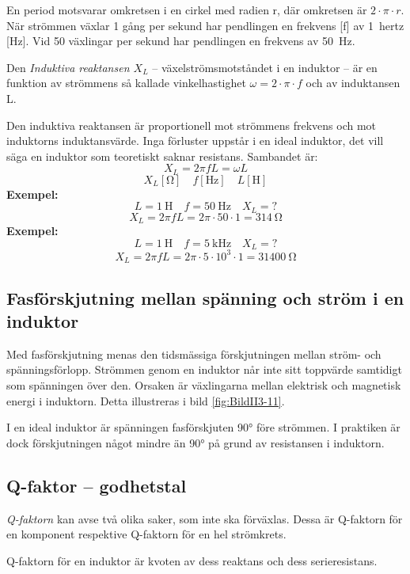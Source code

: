 En period motsvarar omkretsen i en cirkel med radien r, där omkretsen är
\(2 \cdot \pi  \cdot r\). När strömmen växlar 1 gång per sekund har
pendlingen en frekvens [f] av 1~hertz [Hz].
Vid 50 växlingar per sekund har pendlingen en frekvens av \SI{50}{\hertz}.

Den \emph{Induktiva reaktansen \(X_L\)} -- växelströmsmotståndet i en induktor -- 
är en funktion av strömmens så kallade vinkelhastighet \(\omega = 2 \cdot \pi  \cdot f\)
och av induktansen L.

Den induktiva reaktansen är proportionell mot strömmens frekvens och mot
induktorns induktansvärde. Inga förluster uppstår i en ideal induktor, det vill säga 
en induktor som teoretiskt saknar resistans.
Sambandet är:
\[X_L = 2\pi fL = \omega L\]
\[X_L [\si{\ohm}] \quad f [\si{\hertz}] \quad L [\si{\henry}]\]
\textbf{Exempel:}
\[L = \SI{1}{\henry} \quad f = \SI{50}{\hertz} \quad X_L = ?\]
\[X_L = 2\pi fL = 2\pi \cdot 50 \cdot 1 = \SI{314}{\ohm}\]
\textbf{Exempel:}
\[L = \SI{1}{\henry} \quad f = \SI{5}{\kilo\hertz} \quad X_L = ?\]
\[X_L = 2\pi fL = 2\pi  \cdot 5 \cdot 10^3 \cdot 1 = \SI{31400}{\ohm}\]

\subsection{Fasförskjutning mellan spänning och ström i en induktor}

Med fasförskjutning menas den tidsmässiga förskjutningen mellan ström- och
spänningsförlopp. Strömmen genom en induktor når inte sitt toppvärde samtidigt
som spänningen över den. Orsaken är växlingarna mellan elektrisk och magnetisk
energi i induktorn.
Detta illustreras i bild \ref{fig:BildII3-11}.

I en ideal induktor är spänningen fasförskjuten \ang{90} före strömmen.
I praktiken är dock förskjutningen något mindre än \ang{90} på grund av
resistansen i induktorn.

\subsection{Q-faktor -- godhetstal}

\emph{Q-faktorn} kan avse två olika saker, som inte ska förväxlas.
Dessa är Q-faktorn för en komponent respektive Q-faktorn för en hel strömkrets.

Q-faktorn för en induktor är kvoten av dess reaktans och dess serieresistans.

